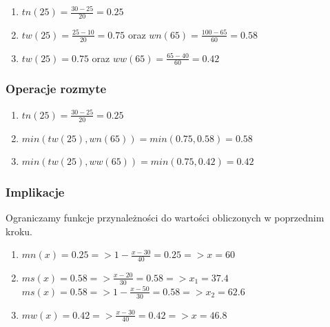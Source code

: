 \documentclass{article}
\begin{document}
\begin{enumerate}[label=Reguła \arabic*:, leftmargin=*]
    \item $tn(25) = \frac{30 - 25}{20} = 0.25$
    \item $tw(25) = \frac{25 - 10}{20} = 0.75$ oraz $wn(65) = \frac{100 - 65}{60} = 0.58$
    \item $tw(25) = 0.75$ oraz $ww(65) = \frac{65 - 40}{60} = 0.42$
\end{enumerate}

\subsubsection*{Operacje rozmyte}

\begin{enumerate}[label=Reguła \arabic*:, leftmargin=*]
    \item $tn(25) = \frac{30 - 25}{20} = 0.25$
    \item $min(tw(25), wn(65)) = min(0.75, 0.58) = 0.58$
    \item $min(tw(25), ww(65)) = min(0.75, 0.42) = 0.42$
\end{enumerate}

\subsubsection*{Implikacje}
Ograniczamy funkcje przynależności do wartości obliczonych 
w poprzednim kroku.
\begin{enumerate}[label=Reguła \arabic*:, leftmargin=*]
    \item $mn(x) = 0.25 => 1 - \frac{x - 30}{40} = 0.25 => x = 60$
    \item $ms(x) = 0.58 => \frac{x - 20}{30} = 0.58 => x_1 = 37.4$\\
          $ms(x) = 0.58 => 1 - \frac{x - 50}{30} = 0.58 => x_2 = 62.6$
    \item $mw(x) = 0.42 => \frac{x - 30}{40} = 0.42 => x = 46.8$
\end{enumerate}
\end{document}
